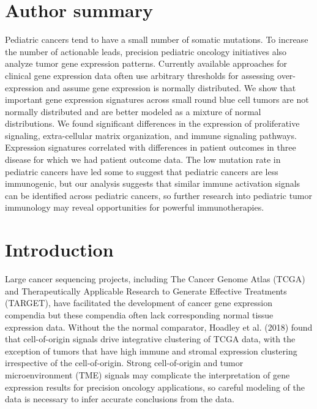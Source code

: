 \documentclass[10pt,letterpaper]{article}
\begin{document}
\section*{Author summary}
Pediatric cancers tend to have a small number of somatic mutations. To increase the number of actionable leads, precision pediatric oncology initiatives also analyze tumor gene expression patterns. Currently available approaches for clinical gene expression data often use arbitrary thresholds for assessing over-expression and assume gene expression is normally distributed. We show that important gene expression signatures across small round blue cell tumors are not normally distributed and are better modeled as a mixture of normal distributions. We found significant differences in the expression of proliferative signaling, extra-cellular matrix organization, and immune signaling pathways. Expression signatures correlated with differences in patient outcomes in three disease for which we had patient outcome data. The low mutation rate in pediatric cancers have led some to suggest that pediatric cancers are less immunogenic, but our analysis suggests that similar immune activation signals can be identified across pediatric cancers, so further research into pediatric tumor immunology may reveal opportunities for powerful immunotherapies.

\linenumbers

\section*{Introduction}
Large cancer sequencing projects, including The Cancer Genome Atlas (TCGA) and Therapeutically Applicable Research to Generate Effective Treatments (TARGET), have facilitated the development of cancer gene expression compendia \cite{vivianToilEnablesReproducible2017, pughGeneticLandscapeHighrisk2013, goldmanUCSCXenaPlatform2018, thecancergenomeatlasresearchnetworkCancerGenomeAtlas2013, newtonTumorMapExploringMolecular2017} but these compendia often lack corresponding normal tissue expression data. Without the the normal comparator, Hoadley et al. (2018) found that cell-of-origin signals drive integrative clustering of TCGA data, with the exception of tumors that have high immune and stromal expression clustering irrespective of the cell-of-origin. Strong cell-of-origin and tumor microenvironment (TME) signals may complicate the interpretation of gene expression results for precision oncology applications, so careful modeling of the data is necessary to infer accurate conclusions from the data. 
\end{document}

